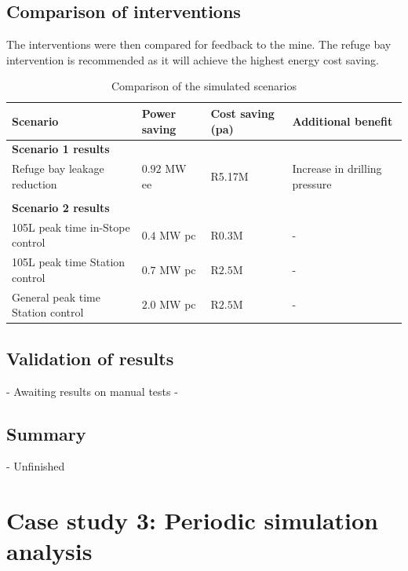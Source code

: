 	\subsection{Comparison of interventions}
	The interventions were then compared for feedback to the mine. The refuge bay intervention is recommended as it will achieve the highest energy cost saving.
	\begin{table}[h]
		\centering
		\begin{tabular}{p{}
				p{}
				p{}
				p{}}
			\hline 
			 \vspace{0.5em}Scenario  &  \vspace{0.5em}Power saving &  Cost saving (\gls{pa}) &  \vspace{0.5em}Additional benefit  \\
			\hline
			\multicolumn{4}{l}{\textbf{Scenario 1 results}} \\
			Refuge bay leakage reduction & $ 0.92 $ MW \gls{ee}  &  R5.17M & Increase in drilling pressure \\
			 \\
			\multicolumn{4}{l}{\textbf{Scenario 2 results}}  \\
			105L peak time in-Stope control & $ 0.4 $ MW \gls{pc} & R$ 0.3 $M& - \\
			105L peak time Station control & $ 0.7 $ MW \gls{pc} & R$ 2.5 $M& - \\
			General peak time Station control & $ 2.0 $ MW \gls{pc} & R$ 2.5 $M& - \\
			\hline 
		\end{tabular}
		\caption{Comparison of the simulated scenarios}
		\label{Table: B Comparison}
	\end{table}

	\subsection{Validation of results}
	
	- Awaiting results on manual tests
	- 
	
	\subsection{Summary}
	- Unfinished
\clearpage

\section{Case study 3: Periodic simulation analysis}
